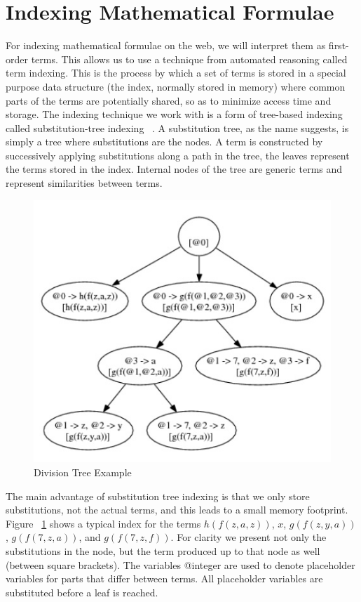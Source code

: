 \documentclass{deliverablereport}
\begin{document}
\section{Indexing Mathematical Formulae}\label{sec:mathindex}

For indexing mathematical formulae on the web, we will interpret them as first-order
terms. This allows us to use a technique from automated reasoning called term
indexing. This is the process by which a set of terms is stored in a special purpose data
structure (the index, normally stored in memory) where common parts of the terms are
potentially shared, so as to minimize access time and storage. The indexing technique we
work with is a form of tree-based indexing called substitution-tree indexing ~\cite{KohSuc:asemf06}. A
substitution tree, as the name suggests, is simply a tree where substitutions are the
nodes. A term is constructed by successively applying substitutions along a path in the
tree, the leaves represent the terms stored in the index. Internal nodes of the tree are
generic terms and represent similarities between terms.

\begin{figure}[h]
\centering
 \includegraphics[scale=0.9]{figure1.jpg}
 \caption{Division Tree Example}
 \label{fig:tree}
\end{figure}

The main advantage of substitution tree indexing is that we only store substitutions, not
the actual terms, and this leads to a small memory footprint. Figure ~\ref{fig:tree} shows a typical
index for the terms $h(f(z, a, z))$, $x$, $g(f(z, y, a))$, $g(f(7, z, a))$, and
$g(f(7, z, f))$. For clarity we present not only the substitutions in the node, but the
term produced up to that node as well (between square brackets). The variables @integer
are used to denote placeholder variables for parts that differ between terms. All
placeholder variables are substituted before a leaf is reached.
\end{document}
